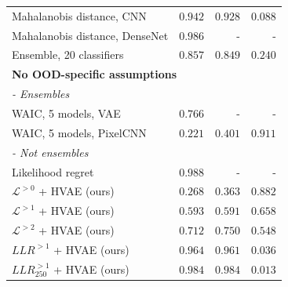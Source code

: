 \begin{frame}
\begin{table}
{\begin{tabular}{lrrr}
            Mahalanobis distance, CNN {\parencite{ren_likelihood_2019}}                     & $0.942$ & $0.928$ & $0.088$ \\
            Mahalanobis distance, DenseNet {\parencite{lee_simple_2018}}                & $0.986$ & - & - \\
            Ensemble, 20 classifiers {\parencite{ren_likelihood_2019, lakshminarayanan_simple_2017}}                  & $0.857$ & $0.849$ & $0.240$ \\
            \multicolumn{4}{l}{\textbf{No OOD-specific assumptions}} \\
            \multicolumn{4}{l}{\textit{- Ensembles}} \\
            WAIC, 5 models, VAE {\parencite{choi_waic_2019}}                          & $0.766$ & - & - \\
            WAIC, 5 models, PixelCNN {\parencite{ren_likelihood_2019}}                      & $0.221$ & $0.401$ & $0.911$ \\
            \multicolumn{4}{l}{\textit{- Not ensembles}} \\
            Likelihood regret \parencite{xiao_likelihood_2020}                               & $\mathbf{0.988}$ & - & - \\
            $\mathcal{L}^{>0}$ + HVAE (ours)                    & $0.268$ & $0.363$ & $0.882$ \\
            $\mathcal{L}^{>1}$ + HVAE (ours)                    & $0.593$ & $0.591$ & $0.658$ \\
            $\mathcal{L}^{>2}$ + HVAE (ours)                    & $0.712$ & $0.750$ & $0.548$ \\
            $LLR^{>1}$ + HVAE (ours)                            & $0.964$ & $0.961$ & $0.036$ \\
            $LLR^{>1}_{250}$ + HVAE (ours)                      & $0.984$ & $\mathbf{0.984}$ & $\mathbf{0.013}$ \\
             \bottomrule
        \end{tabular}%
        }
    \end{table}
\end{frame}



